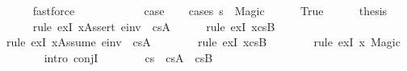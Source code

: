 \begin{isabellebody}
\ \ \ \ \isamarkupfalse%
\ fastforce\ \ \ \ \ \ \ \ \isanewline
\ \ \isamarkupfalse%
\ {\isacharquery}{\kern0pt}case\isanewline
\ \ \isamarkupfalse%
\ {\isacharparenleft}{\kern0pt}cases\ {\isachardoublequoteopen}s{\isacharprime}{\kern0pt}{\isacharprime}{\kern0pt}\ {\isacharequal}{\kern0pt}\ Magic{\isachardoublequoteclose}{\isacharparenright}{\kern0pt}\isanewline
\ \ \ \ \isamarkupfalse%
\ True\isanewline
\ \ \ \ \isamarkupfalse%
\ {\isacharquery}{\kern0pt}thesis\ \isanewline
\ \ \ \ \isamarkupfalse%
\ {\isacharparenleft}{\kern0pt}rule\ exI{\isacharbrackleft}{\kern0pt}\ {\isacharquery}{\kern0pt}x{\isacharequal}{\kern0pt}{\isachardoublequoteopen}Assert\ e{\isacharunderscore}{\kern0pt}inv\ {\isacharhash}{\kern0pt}\ cs{}A{\isachardoublequoteclose}{\isacharbrackright}{\kern0pt}{\isacharparenright}{\kern0pt}\isanewline
\ \ \ \ \isamarkupfalse%
\ {\isacharparenleft}{\kern0pt}rule\ exI{\isacharbrackleft}{\kern0pt}\ {\isacharquery}{\kern0pt}x{\isacharequal}{\kern0pt}{\isachardoublequoteopen}cs{}B{\isachardoublequoteclose}{\isacharbrackright}{\kern0pt}{\isacharparenright}{\kern0pt}\isanewline
\ \ \ \ \isamarkupfalse%
\ {\isacharparenleft}{\kern0pt}rule\ exI{\isacharbrackleft}{\kern0pt}\ {\isacharquery}{\kern0pt}x{\isacharequal}{\kern0pt}{\isachardoublequoteopen}Assume\ e{\isacharunderscore}{\kern0pt}inv\ {\isacharhash}{\kern0pt}\ cs{}A{\isachardoublequoteclose}{\isacharbrackright}{\kern0pt}{\isacharparenright}{\kern0pt}\isanewline
\ \ \ \ \ \ \isamarkupfalse%
\ {\isacharparenleft}{\kern0pt}rule\ exI{\isacharbrackleft}{\kern0pt}\ {\isacharquery}{\kern0pt}x{\isacharequal}{\kern0pt}cs{}B{\isacharbrackright}{\kern0pt}{\isacharparenright}{\kern0pt}\isanewline
\ \ \ \ \ \ \isamarkupfalse%
\ {\isacharparenleft}{\kern0pt}rule\ exI{\isacharbrackleft}{\kern0pt}\ {\isacharquery}{\kern0pt}x{\isacharequal}{\kern0pt}\ Magic{\isacharbrackright}{\kern0pt}{\isacharparenright}{\kern0pt}\isanewline
\ \ \ \ \ \ \isamarkupfalse%
\ {\isacharparenleft}{\kern0pt}intro\ conjI{\isacharparenright}{\kern0pt}\isanewline
\ \ \ \ \ \ \isamarkupfalse%
\ {\isacartoucheopen}cs{}\ {\isacharequal}{\kern0pt}\ cs{}A\ {\isacharat}{\kern0pt}\ cs{}B{\isacartoucheclose}\ \isamarkupfalse%

\end{isabellebody}
